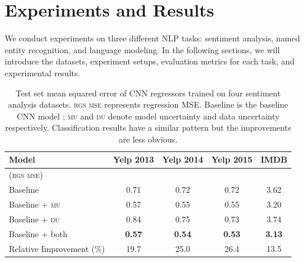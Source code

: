 \documentclass[letterpaper]{article} %
\newcommand{\william}[1]{\textcolor{blue}{[William: #1]}}
\begin{document}
\section{Experiments and Results}
We conduct experiments on three different NLP tasks: sentiment analysis, named entity recognition, and language modeling. In the following sections, we will introduce the datasets, experiment setups, evaluation metrics for each task, and experimental results.

\begin{table}[t!]
\begin{center}
\begin{tabular}{lcccc}
\hline
{\bf Model} & {\bf Yelp 2013} & {\bf Yelp 2014} & {\bf Yelp 2015} & {\bf IMDB}\\  \hline
(\textsc{rgs mse}) \\
Baseline & 0.71 & 0.72 & 0.72 & 3.62 \\
Baseline + \textsc{mu} & 0.57 & 0.55 & 0.55 & 3.20\\
Baseline + \textsc{du} & 0.84 & 0.75 & 0.73 & 3.74 \\
Baseline + both        & \bf 0.57 & \bf 0.54 & \bf 0.53 & \bf 3.13 \\ \hline
Relative Improvement (\%) & 19.7 & 25.0 & 26.4 & 13.5\\
\hline
\end{tabular}
\end{center}
\caption{\label{tab:sent_results}Test set mean squared error of CNN regressors trained on four sentiment analysis datasets. \textsc{rgs mse} represents regression MSE. Baseline is the baseline CNN model \cite{kim2014convolutional}; \textsc{mu} and \textsc{du} denote model uncertainty and data uncertainty respectively. Classification results have a similar pattern but the improvements are less obvious.
}
\end{table}
\end{document}
